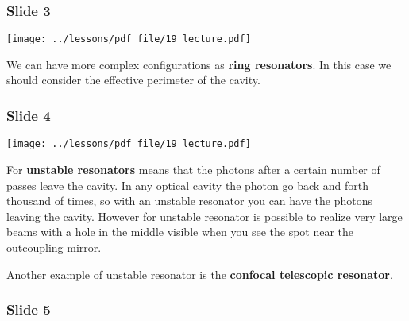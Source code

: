 \documentclass[../main/main.tex]{subfiles}
\begin{document}
\subsubsection*{Slide 3}

\begin{minipage}[]{0.5\linewidth}
\centering
\texttt{[image: ../lessons/pdf\_file/19\_lecture.pdf]}
\end{minipage}
\hspace{0.3cm}\vspace{0.3cm}
\begin{minipage}[c]{0.47\linewidth}

We can have more complex configurations as \textbf{ring resonators}. In this case we should consider the effective perimeter of the cavity.

\end{minipage}

\newpage

\subsubsection*{Slide 4}

\begin{minipage}[]{0.5\linewidth}
\centering
\texttt{[image: ../lessons/pdf\_file/19\_lecture.pdf]}
\end{minipage}
\hspace{0.3cm}\vspace{0.3cm}
\begin{minipage}[c]{0.47\linewidth}

For \textbf{unstable resonators} means that the photons after a certain number of passes leave the cavity. In any optical cavity the photon go back and forth thousand of times, so with an unstable resonator you can have the photons leaving the cavity. However for unstable resonator is possible to realize very large beams with a hole in the middle visible when you see the spot near the outcoupling mirror.

Another example of unstable resonator is the \textbf{confocal telescopic resonator}.


\end{minipage}

\subsubsection*{Slide 5}
\end{document}
